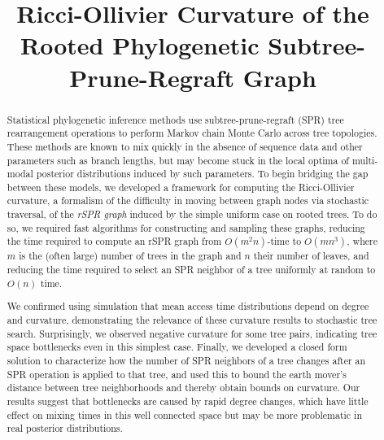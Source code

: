 \documentclass[11pt,onecolumn,conference]{IEEEtran}
\begin{document}
\title{Ricci-Ollivier Curvature of the Rooted Phylogenetic Subtree-Prune-Regraft Graph}

\author{
	\and
}

\maketitle
\IEEEpeerreviewmaketitle

\begin{abstract}
Statistical phylogenetic inference methods use subtree-prune-regraft (SPR) tree rearrangement operations to perform Markov chain Monte Carlo across tree topologies.
These methods are known to mix quickly in the absence of sequence data and other parameters such as branch lengths, but may become stuck in the local optima of  multi-modal posterior distributions induced by such parameters.
To begin bridging the gap between these models, we developed a framework for computing the Ricci-Ollivier curvature, a formalism of the difficulty in moving between graph nodes via stochastic traversal, of the \emph{rSPR graph} induced by the simple uniform case on rooted trees.
To do so, we required fast algorithms for constructing and sampling these graphs, reducing the time required to compute an rSPR graph from $O(m^2n)$-time to $O(mn^3)$, where $m$ is the (often large) number of trees in the graph and $n$ their number of leaves, and reducing the time required to select an SPR neighbor of a tree uniformly at random to $O(n)$ time. 

We confirmed using simulation that mean access time distributions depend on degree and curvature, demonstrating the relevance of these curvature results to stochastic tree search.
Surprisingly, we observed negative curvature for some tree pairs, indicating tree space bottlenecks even in this simplest case.
Finally, we developed a closed form solution to characterize how the number of SPR neighbors of a tree changes after an SPR operation is applied to that tree, and used this to bound the earth mover's distance between tree neighborhoods and thereby obtain bounds on curvature.
Our results suggest that bottlenecks are caused by rapid degree changes, which have little effect on mixing times in this well connected space but may be more problematic in real posterior distributions.

\end{abstract}
\end{document}
